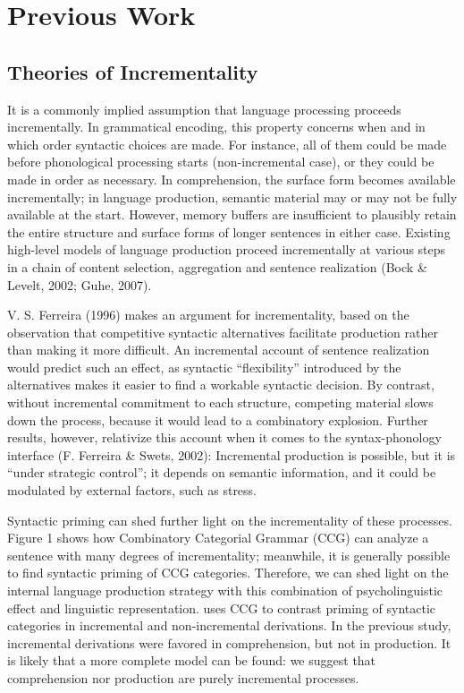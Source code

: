 \section{Previous Work}
\subsection{Theories of Incrementality}
It is a commonly implied assumption that language processing proceeds incrementally. In grammatical encoding, this property concerns when and in which order syntactic choices are made. For instance, all of them could be made before  phonological processing starts (non-incremental case), or they could be made in order as necessary. In comprehension, the surface form becomes available incrementally; in language production, semantic material may or may not be fully available at the start. However, memory buffers are insufficient to plausibly retain the entire structure and surface forms of longer sentences in either case. Existing high-level models of language production proceed incrementally at various steps in a chain of content selection, aggregation and sentence realization (Bock \& Levelt, 2002; Guhe, 2007).

V. S. Ferreira (1996) makes an argument for incrementality, based on the observation that competitive syntactic alternatives facilitate production rather than making it more difficult. An incremental account of sentence realization would predict such an effect, as syntactic “flexibility” introduced by the alternatives makes it easier to find a workable syntactic decision. By contrast, without incremental commitment to each structure, competing material slows down the process, because it would lead to a combinatory explosion. Further results, however, relativize this account when it comes to the syntax-phonology interface (F. Ferreira \& Swets, 2002): Incremental production is possible, but it is “under strategic control”; it depends on semantic information, and it could be modulated by external factors, such as stress.

Syntactic priming can shed further light on the incrementality of these processes. Figure 1 shows how Combinatory Categorial Grammar (CCG) can analyze a sentence with many degrees of incrementality; meanwhile, it is generally possible to find syntactic priming of CCG categories. Therefore, we can shed light on the internal language production strategy with this combination of psycholinguistic effect and linguistic representation. \citet{ReitterHock2006} uses CCG to contrast priming of syntactic categories in incremental and non-incremental derivations. In the previous study, incremental derivations were favored in comprehension, but not in production. It is likely that a more complete model can be found: we suggest that comprehension nor production are purely incremental processes. 


